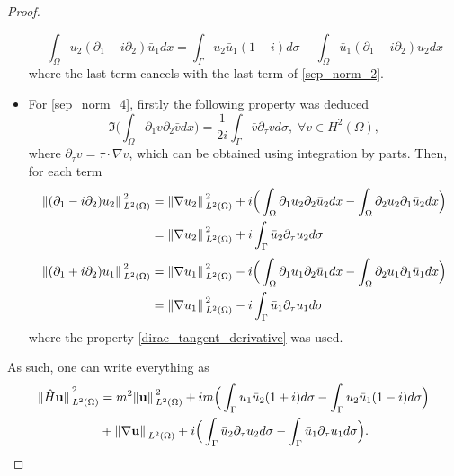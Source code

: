 \begin{proof}
\begin{itemize}
                \[
                \int_\Omega u_2(\partial_1 - i \partial_2)\bar{u}_1dx = \int_{\Gamma} u_2\bar{u}_1(1-i)d\sigma - \int_\Omega \bar{u}_1(\partial_1 - i \partial_2)u_2dx 
                \]
                where the last term cancels with the last term of \eqref{sep_norm_2}.
        \item For \eqref{sep_norm_4}, firstly the following property was deduced
                \begin{equation}\label{dirac_tangent_derivative}
                \Im \Big(\int_\Omega \partial_1 v \partial_2 \bar{v}dx\Big) = \frac{1}{2 i} \int_{\Gamma} \bar{v} \partial_\tau v d \sigma, \; \forall v \in H^2(\Omega),
                \end{equation}
                where \(\partial_\tau v= \tau \cdot \nabla v\), which can be obtained using integration by parts.
                Then, for each term
                \begin{align*}
                \norm*{(\partial_1 - i \partial_2)u_2}_{L^2(\Omega)}^2 &= \norm*{\nabla u_2}_{L^2(\Omega)}^2 + i \Big(\int_\Omega \partial_1 u_2 \partial_2 \bar{u}_2dx - \int_\Omega \partial_2 u_2 \partial_1 \bar{u}_2dx\Big)\\
                & = \norm*{\nabla u_2}_{L^2(\Omega)}^2 + i\int_{\Gamma} \bar{u}_2 \partial_\tau u_2 d \sigma
                \end{align*}
                \vspace*{-1cm}
                \begin{align*}
                \norm*{(\partial_1 + i \partial_2)u_1}_{L^2(\Omega)}^2 &= \norm*{\nabla u_1}_{L^2(\Omega)}^2 - i \Big(\int_\Omega \partial_1 u_1 \partial_2 \bar{u}_1dx - \int_\Omega \partial_2 u_1 \partial_1 \bar{u}_1dx\Big)\\
                & = \norm*{\nabla u_1}_{L^2(\Omega)}^2 - i\int_{\Gamma} \bar{u}_1 \partial_\tau u_1 d \sigma
                \end{align*}
                where the property \ref{dirac_tangent_derivative} was used.
    \end{itemize}
    As such, one can write everything as
    \begin{align*}
        \norm*{\hat{H}\mathbf{u}}_{L^2(\Omega)}^2 &= m^2 \norm*{\mathbf{u}}_{L^2(\Omega)}^2 + i m \Big(\int_{\Gamma} u_1\bar{u}_2(1+i)d\sigma - \int_{\Gamma} u_2\bar{u}_1(1-i)d\sigma \Big)\\
        & + \norm*{\nabla \mathbf{u}}_{L^2(\Omega)} + i\Big( \int_{\Gamma} \bar{u}_2 \partial_\tau u_2 d \sigma -  \int_{\Gamma} \bar{u}_1 \partial_\tau u_1 d \sigma \Big).

\end{align*}
\end{proof}
